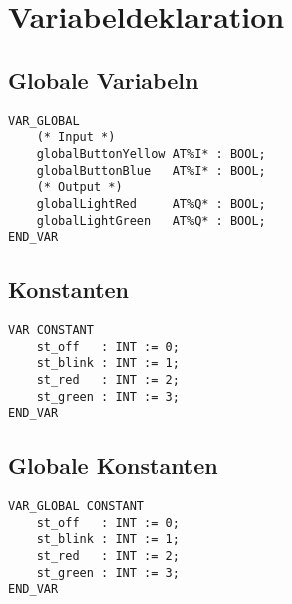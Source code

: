 


\section{Variabeldeklaration}

\subsection{Globale Variabeln}
\begin{lstlisting}
VAR_GLOBAL
    (* Input *)
    globalButtonYellow AT%I* : BOOL;
    globalButtonBlue   AT%I* : BOOL;
    (* Output *)
    globalLightRed     AT%Q* : BOOL;
    globalLightGreen   AT%Q* : BOOL;
END_VAR
\end{lstlisting}

\subsection{Konstanten}
\begin{lstlisting}
VAR CONSTANT
    st_off   : INT := 0;
    st_blink : INT := 1;
    st_red   : INT := 2;
    st_green : INT := 3;
END_VAR
\end{lstlisting}

\subsection{Globale Konstanten}
\begin{lstlisting}
VAR_GLOBAL CONSTANT
    st_off   : INT := 0;
    st_blink : INT := 1;
    st_red   : INT := 2;
    st_green : INT := 3;
END_VAR
\end{lstlisting}
